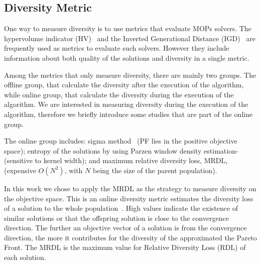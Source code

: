 \subsection{Diversity Metric}


One way to measure diversity is to use metrics that evaluate MOPs solvers. The hypervolume indicator (HV)~\cite{zitzler1998multiobjective} and the Inverted Generational Distance (IGD)~\cite{zhang2008rm} are frequently used as metrics to evaluate such solvers. However they include information about both quality of the solutions and diversity in a single metric.

Among the metrics that only measure diversity, there are mainly two groups. The offline group, that calculate the diversity after the execution of the algorithm, while online group, that calculate the diversity during the execution of the algorithm. We are interested in measuring diversity during the execution of the algorithm, therefore we  briefly introduce some studies that are part of the online group.
%

The online group includes: sigma method~\cite{mostaghim2003strategies}  (PF lies in the positive objective space); entropy of the solutions by using Parzen window density estimation-\cite{tan2008evolutionary} (sensitive to kernel width); and maximum relative diversity loss, MRDL, ~\cite{gee2015online} (expensive $O(N^2)$, with $N$ being the size of the parent population).



In this work we chose to apply the MRDL as the strategy to measure diversity on the objective space. This is an online diversity metric estimates the diversity loss of a solution to the whole population~\cite{gee2015online}. High values indicate the existence of similar solutions or that the offspring solution is close to the convergence direction. The further an objective vector of a solution is from the convergence direction, the more it contributes for the diversity of the approximated the Pareto Front. The MRDL is the maximum value for Relative Diversity Loss (RDL) of each solution.



